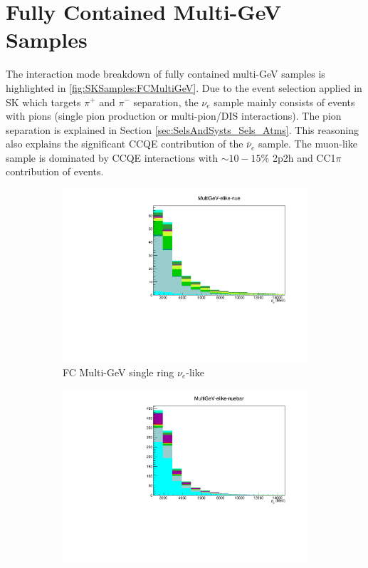 \section{Fully Contained Multi-GeV Samples}
The interaction mode breakdown of fully contained multi-GeV samples is highlighted in \autoref{fig:SKSamples:FCMultiGeV}. Due to the event selection applied in SK which targets $\pi^+$ and $\pi^-$ separation, the $\nu_e$ sample mainly consists of events with pions (single pion production or multi-pion/DIS interactions). The pion separation is explained in Section \autoref{sec:SelsAndSysts_Sels_Atms}. This reasoning also explains the significant CCQE contribution of the $\bar{\nu}_e$ sample. The muon-like sample is dominated by CCQE interactions with $\sim10-15\%$ 2p2h and CC1$\pi$ contribution of events.

\begin{figure}[ht]
    \begin{subfigure}[t]{0.49\textwidth}
    \includegraphics[width=\textwidth, trim= 0 0 0 30, clip]{Figures/Selections/AtmosphericByMode/MultiGeV-elike-nue_LepMom.pdf}
    \caption{FC Multi-GeV single ring $\nu_e$-like}
    \end{subfigure}
    \begin{subfigure}[t]{0.49\textwidth}
    \includegraphics[width=\textwidth, trim= 0 0 0 30, clip]{Figures/Selections/AtmosphericByMode/MultiGeV-elike-nuebar_LepMom.pdf}

\end{subfigure}
\end{figure}
